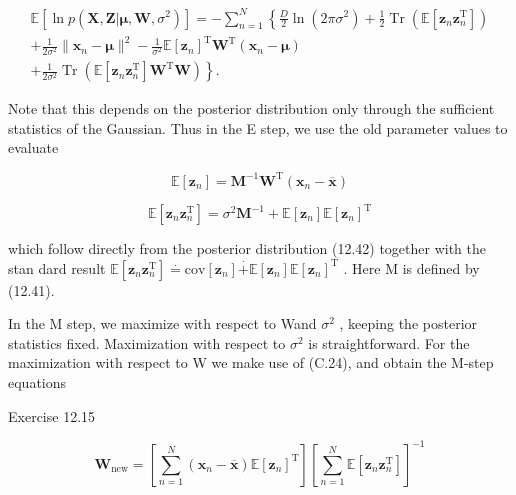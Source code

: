 \documentclass[
  10
]{article}
\begin{document}
\[
\begin{array}{l} \mathbb {E} [ \ln p (\mathbf {X}, \mathbf {Z} | \boldsymbol {\mu}, \mathbf {W}, \sigma^ {2}) ] = - \sum_ {n = 1} ^ {N} \left\{\frac {D}{2} \ln (2 \pi \sigma^ {2}) + \frac {1}{2} \operatorname{Tr} \left(\mathbb {E} [ \mathbf {z} _ {n} \mathbf {z} _ {n} ^ {\mathrm{T}} ]\right) \right. \\ \left. + \frac {1}{2 \sigma^ {2}} \| \mathbf {x} _ {n} - \boldsymbol {\mu} \| ^ {2} - \frac {1}{\sigma^ {2}} \mathbb {E} [ \mathbf {z} _ {n} ] ^ {\mathrm{T}} \mathbf {W} ^ {\mathrm{T}} (\mathbf {x} _ {n} - \boldsymbol {\mu}) \right. \\ \left. + \frac {1}{2 \sigma^ {2}} \operatorname{Tr} \left(\mathbb {E} [ \mathbf {z} _ {n} \mathbf {z} _ {n} ^ {\mathrm{T}} ] \mathbf {W} ^ {\mathrm{T}} \mathbf {W}\right) \right\}. \end{array} \tag {12.53}
\]

Note that this depends on the posterior distribution only through the
sufficient statistics of the Gaussian. Thus in the E step, we use the
old parameter values to evaluate

\[
{\mathbb {E} [ \mathbf {z} _ {n} ]} = {\mathbf {M} ^ {- 1} \mathbf {W} ^ {\mathrm{T}} (\mathbf {x} _ {n} - \overline {{\mathbf {x}}})}\tag{12.54}
\]

\[
{\mathbb {E} [ \mathbf {z} _ {n} \mathbf {z} _ {n} ^ {\mathrm{T}} ]} = {\sigma^ {2} \mathbf {M} ^ {- 1} + \mathbb {E} [ \mathbf {z} _ {n} ] \mathbb {E} [ \mathbf {z} _ {n} ] ^ {\mathrm{T}}}\tag{12.55}
\]

which follow directly from the posterior distribution (12.42) together
with the stan dard result
\(\mathbb { E } [ \mathbf { z } _ { n } \mathbf { z } _ { n } ^ { \mathrm { T } } ] \stackrel { \cdot } { = } \mathrm { c o v } [ \mathbf { z } _ { n } ] \stackrel { \cdot } { + } \mathbb { E } [ \mathbf { z } _ { n } ] \mathbb { E } [ \mathbf { z } _ { n } ] ^ { \mathrm { T } }\)
. Here M is defined by (12.41).

In the M step, we maximize with respect to Wand \(\sigma ^ { 2 }\) ,
keeping the posterior statistics fixed. Maximization with respect to
\(\sigma ^ { 2 }\) is straightforward. For the maximization with respect
to W we make use of (C.24), and obtain the M-step equations

Exercise 12.15

\[
{\mathbf {W} _ {\mathrm{new}}} = {\left[ \sum_ {n = 1} ^ {N} (\mathbf {x} _ {n} - \overline {{\mathbf {x}}}) \mathbb {E} [ \mathbf {z} _ {n} ] ^ {\mathrm{T}} \right] \left[ \sum_ {n = 1} ^ {N} \mathbb {E} [ \mathbf {z} _ {n} \mathbf {z} _ {n} ^ {\mathrm{T}} ] \right] ^ {- 1}}\tag{12.56}
\]
\end{document}

